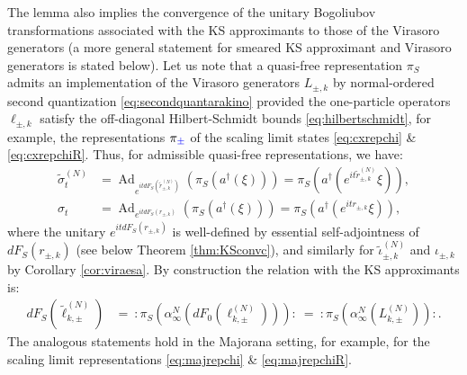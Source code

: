 \documentclass[a4paper, 11pt]{article}
\DeclareMathOperator{\Ad}{Ad}
\DeclareMathOperator{\1}{\mathds{1}}
\begin{document}
The lemma also implies the convergence of the unitary Bogoliubov transformations associated with the KS approximants to those of the Virasoro generators (a more general statement for smeared KS approximant and Virasoro generators is stated below). Let us note that a quasi-free representation $\pi_{S}$ admits an implementation of the Virasoro generators $L_{\pm,k}$ by normal-ordered second quantization \eqref{eq:secondquantarakino} provided the one-particle operators $\ell_{\pm,k}$ satisfy the off-diagonal Hilbert-Schmidt bounds \eqref{eq:hilbertschmidt}, for example, the representations $\pi_{{\color{blue}\pm}}$ of the scaling limit states \eqref{eq:cxrepchi} \& \eqref{eq:cxrepchiR}. Thus, for admissible quasi-free representations, we have:
\begin{align}
\label{eq:KSconvgroup}
\tilde{\sigma}^{(N)}_{t} & = \Ad_{e^{it dF_{S}(\tilde{r}^{(N)}_{\pm,k})}}(\pi_{S}(a^{\dagger}(\xi)\!)\!) = \pi_{S}(a^{\dagger}(e^{it \tilde{r}^{(N)}_{\pm,k}}\xi)\!), \\ \nonumber
\sigma_{t} & = \Ad_{e^{it dF_{S}(r_{\pm,k})}}(\pi_{S}(a^{\dagger}(\xi)\!)\!) = \pi_{S}(a^{\dagger}(e^{it r_{\pm,k}}\xi)\!),
\end{align}
where the unitary $e^{it dF_{S}(r_{\pm,k})}$ is well-defined by essential self-adjointness of $dF_{S}(r_{\pm,k})$ (see below Theorem \ref{thm:KSconvc}), and similarly for $\tilde{\iota}^{(N)}_{\pm,k}$ and $\iota_{\pm,k}$ by Corollary \ref{cor:viraesa}. By construction the relation with the KS approximants is:
\begin{align}
\label{eq:KShermiteanparts}
dF_{S}(\tilde{\ell}^{(N)}_{k,\pm}) & =\ :\pi_{S}(\alpha^{N}_{\infty}(dF_{0}(\ell^{(N)}_{k,\pm}))):\ =\ :\pi_{S}(\alpha^{N}_{\infty}(L^{(N)}_{k,\pm})):. 
\end{align}
The analogous statements hold in the Majorana setting, for example, for the scaling limit representations \eqref{eq:majrepchi} \& \eqref{eq:majrepchiR}.
\end{document}
